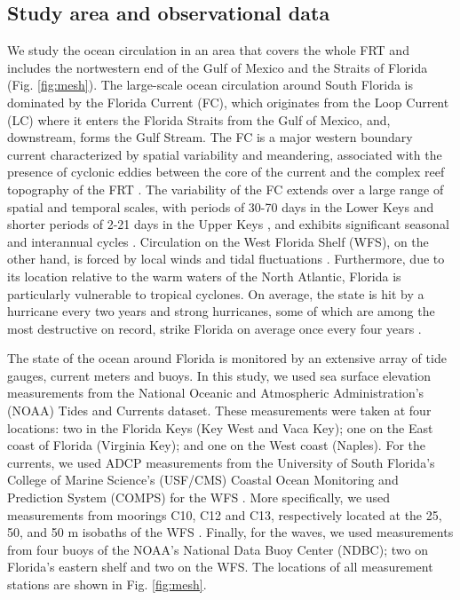 \documentclass[preprint,12pt,authoryear]{elsarticle}
\begin{document}
\subsection{Study area and observational data}
We study the ocean circulation in an area that covers the whole FRT and includes the nortwestern end of the Gulf of Mexico and the Straits of Florida (Fig. \ref{fig:mesh}). The large-scale ocean circulation around South Florida is dominated by the Florida Current (FC), which originates from the Loop Current (LC) where it enters the Florida Straits from the Gulf of Mexico, and, downstream, forms the Gulf Stream. The FC is a major western boundary current characterized by spatial variability and meandering, associated with the presence of cyclonic eddies between the core of the current and the complex reef topography of the FRT \citep{lee1995florida,kourafalou2012florida}. The variability of the FC extends over a large range of spatial and temporal scales, with periods of 30-70 days in the Lower Keys \citep{lee1995florida} and shorter periods of 2-21 days in the Upper Keys \citep{lee1977low}, and exhibits significant seasonal and interannual cycles \citep{johns1987meandering, lee1988wind,schott1988variability}. Circulation on the West Florida Shelf (WFS), on the other hand, is forced by local winds and tidal fluctuations \citep{lee2002volume,liu2012seasonal}. Furthermore, due to its location relative to the warm waters of the North Atlantic, Florida is particularly vulnerable to tropical cyclones. On average, the state is hit by a hurricane every two years and strong hurricanes, some of which are among the most destructive on record, strike Florida on average once every four years \citep{malmstadt2009florida}.

The state of the ocean around Florida is monitored by an extensive array of tide gauges, current meters and buoys. In this study, we used sea surface elevation measurements from the National Oceanic and Atmospheric Administration’s (NOAA) Tides and Currents dataset. These measurements were taken at four locations: two in the Florida Keys (Key West and Vaca Key); one on the East coast of Florida (Virginia Key); and one on the West coast (Naples). For the currents, we used ADCP measurements from the University of South Florida's College of Marine Science's (USF/CMS) Coastal Ocean Monitoring and Prediction System (COMPS) for the WFS \citep{weisberg2009mean}. More specifically, we used measurements from moorings C10, C12 and C13, respectively located at the 25, 50, and 50 m isobaths of the WFS \citep{liu2020impacts}. Finally, for the waves, we used measurements from four buoys of the NOAA's National Data Buoy Center (NDBC); two on Florida's eastern shelf and two on the WFS. The locations of all measurement stations are shown in Fig. \ref{fig:mesh}.
\end{document}
